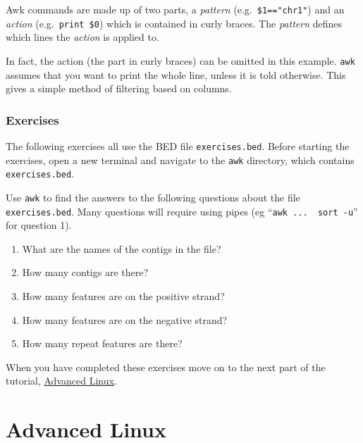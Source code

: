 \documentclass[11pt]{article}
\providecommand{\tightlist}{%
      \setlength{\itemsep}{0pt}\setlength{\parskip}{0pt}}
\begin{document}
Awk commands are made up of two parts, a \textit{pattern}
(e.g.~\texttt{\$1=="chr1"}) and an \textit{action}
(e.g.~\texttt{print\ \$0}) which is contained in curly braces. The
\textit{pattern} defines which lines the \textit{action} is applied to.

In fact, the action (the part in curly braces) can be omitted in this
example. \texttt{awk} assumes that you want to print the whole line,
unless it is told otherwise. This gives a simple method of filtering
based on columns.

    \hypertarget{exercises}{%
\subsubsection{Exercises}\label{exercises}}

The following exercises all use the BED file \texttt{exercises.bed}.
Before starting the exercises, open a new terminal and navigate to the
\texttt{awk} directory, which contains \texttt{exercises.bed}.

Use \texttt{awk} to find the answers to the following questions about
the file \texttt{exercises.bed}. Many questions will require using pipes
(eg ``\texttt{awk\ ...\ \textbar{}\ sort\ -u}'' for question 1).

\begin{enumerate}
\def\labelenumi{\arabic{enumi}.}
\tightlist
\item
  What are the names of the contigs in the file?
\item
  How many contigs are there?
\item
  How many features are on the positive strand?
\item
  How many features are on the negative strand?
\item
  How many repeat features are there?
\end{enumerate}

    When you have completed these exercises move on to the next part of the
tutorial, \href{advanced_linux.ipynb}{Advanced Linux}.





\newpage





    \hypertarget{advanced-linux}{%
\section{Advanced Linux}\label{advanced-linux}}
\end{document}
